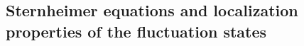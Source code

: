\documentclass[a4paper]{article}
\newcommand{\lb}{\label}
\newcommand{\op}[1]{\hat {#1}}
\newcommand{\brket}[2]{\langle  #1 | #2 \rangle} %
\begin{document}




\subsection{Sternheimer equations and localization properties of the fluctuation states}
\lb{LocalizationFluctuationStates}
\end{document}

